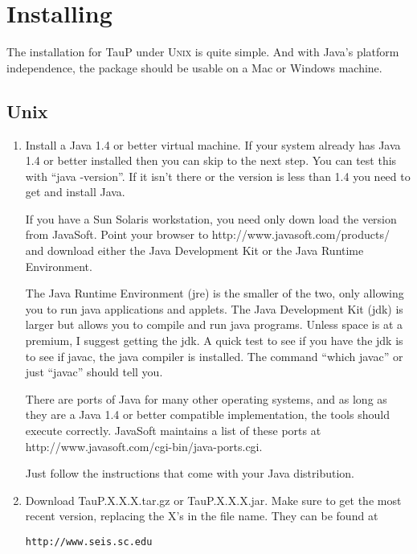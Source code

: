 
\section{Installing}
\label{install}

The installation for TauP under \textsc{Unix} is quite simple. And with Java's 
platform independence, the package should be usable on a Mac or Windows
machine.

\subsection{Unix}

\begin{enumerate}
\item Install a Java 1.4 or better virtual machine. If your system already has Java 1.4
or better installed then you can skip to the next step. You can test this
with ``java -version''. If it isn't there or the version is less than 1.4
you need to get and install Java.

If you have a Sun Solaris
workstation, you need only down load the version from JavaSoft. Point
your browser to http://www.javasoft.com/products/ and download either
the Java Development Kit or the Java Runtime Environment.

The Java Runtime Environment (jre)
is the smaller of the two, only allowing you to run java applications and applets.
The Java Development Kit (jdk) is larger but allows you
to compile and run java programs. 
Unless space is at a
premium, I suggest getting the jdk. A quick test to see if you have
the jdk is to see if javac, the java compiler is installed. The command
``which javac'' or just ``javac'' should tell you. 

There are ports of Java for many other operating systems, and as long as
they are a Java 1.4 or better compatible implementation, the tools 
should execute correctly.
JavaSoft maintains a list of these ports at\newline
http://www.javasoft.com/cgi-bin/java-ports.cgi.

Just follow the instructions that come with your Java distribution.

\item Download TauP.X.X.X.tar.gz or TauP.X.X.X.jar. Make sure to get the most recent version, replacing the X's  in the file name. They can be found at

\texttt{http://www.seis.sc.edu}


\end{enumerate}
